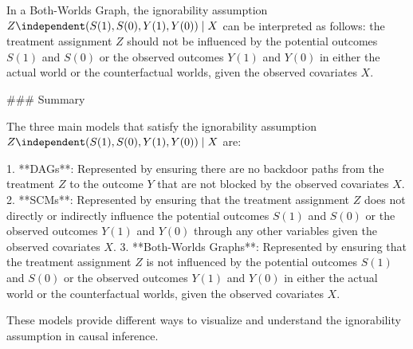 In a Both-Worlds Graph, the ignorability assumption \( Z \independent (S(1), S(0), Y(1), Y(0)) \mid X \) can be interpreted as follows: the treatment assignment \( Z \) should not be influenced by the potential outcomes \( S(1) \) and \( S(0) \) or the observed outcomes \( Y(1) \) and \( Y(0) \) in either the actual world or the counterfactual worlds, given the observed covariates \( X \).

### Summary

The three main models that satisfy the ignorability assumption \( Z \independent (S(1), S(0), Y(1), Y(0)) \mid X \) are:

1. **DAGs**: Represented by ensuring there are no backdoor paths from the treatment \( Z \) to the outcome \( Y \) that are not blocked by the observed covariates \( X \).
2. **SCMs**: Represented by ensuring that the treatment assignment \( Z \) does not directly or indirectly influence the potential outcomes \( S(1) \) and \( S(0) \) or the observed outcomes \( Y(1) \) and \( Y(0) \) through any other variables given the observed covariates \( X \).
3. **Both-Worlds Graphs**: Represented by ensuring that the treatment assignment \( Z \) is not influenced by the potential outcomes \( S(1) \) and \( S(0) \) or the observed outcomes \( Y(1) \) and \( Y(0) \) in either the actual world or the counterfactual worlds, given the observed covariates \( X \).

These models provide different ways to visualize and understand the ignorability assumption in causal inference.